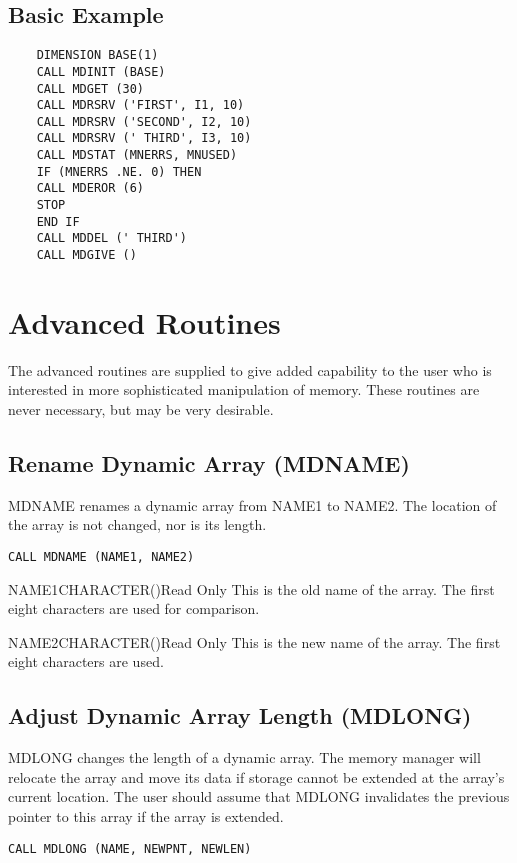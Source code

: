 \subsection{Basic Example}
\begin{verbatim}
    DIMENSION BASE(1)
    CALL MDINIT (BASE)
    CALL MDGET (30)
    CALL MDRSRV ('FIRST', I1, 10)
    CALL MDRSRV ('SECOND', I2, 10)
    CALL MDRSRV (' THIRD', I3, 10)
    CALL MDSTAT (MNERRS, MNUSED)
    IF (MNERRS .NE. 0) THEN
    CALL MDEROR (6)
    STOP
    END IF
    CALL MDDEL (' THIRD')
    CALL MDGIVE ()
\end{verbatim}

\section{Advanced Routines}
The advanced routines are supplied to give added capability to the user who
is interested in more sophisticated manipulation of memory.  These routines
are never necessary, but may be very desirable.

\subsection{Rename Dynamic Array (MDNAME)}
MDNAME renames a dynamic array from NAME1 to NAME2.  The location of the
array is not changed, nor is its length.

\verb+CALL MDNAME (NAME1, NAME2)+

\begin{argy}{NAME1}{CHARACTER\last(\last)}{Read Only}
This is the old name of the array.  The first eight characters are used for
comparison. 
\end{argy}

\begin{argy}{NAME2}{CHARACTER\last(\last)}{Read Only}
This is the new name of the array.  The first eight characters are used. 
\end{argy}

\subsection{Adjust Dynamic Array Length (MDLONG)}
MDLONG changes the length of a dynamic array.  The memory manager will
relocate the array and move its data if storage cannot be extended at the
array's current location.  The user should assume that MDLONG invalidates
the previous pointer to this array if the array is extended.

\verb+CALL MDLONG (NAME, NEWPNT, NEWLEN)+

